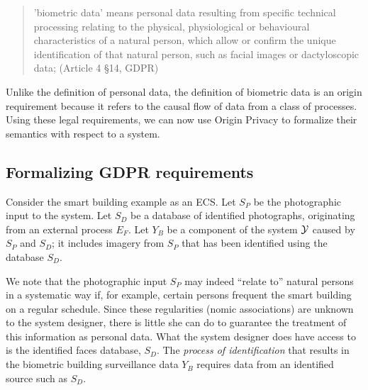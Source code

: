 \documentclass[../thesis.tex]{subfiles}
\begin{document}
\begin{quote}
  'biometric data' means personal data resulting from
  specific technical processing relating to the physical,
  physiological or behavioural characteristics of a
  natural person, which allow or confirm the unique
  identification of that natural person, such as facial
  images or dactyloscopic data; (Article 4 \S 14, GDPR)
\end{quote}

Unlike the definition of personal data, the definition
of biometric data is an origin requirement because it
refers to the causal flow of data from a class of
processes.
Using these legal requirements, we can now
use Origin Privacy to formalize their semantics
with respect to a system.

\subsection{Formalizing GDPR requirements}

Consider the smart building example as an ECS.
Let $S_P$ be the photographic input to the system.
Let $S_D$ be a database of identified photographs,
originating from an external process $E_F$.
Let $Y_B$ be a component of the system $\mathcal{Y}$ caused by
$S_P$ and $S_D$; it includes imagery from $S_P$
that has been identified using the database $S_D$.

\begin{center}
\end{center}

We note that the photographic input $S_P$ may
indeed ``relate to'' natural persons in a systematic
way if, for example, certain persons frequent the
smart building on a regular schedule.
Since these regularities (nomic associations) are
unknown to the system designer, there is little she
can do to guarantee the treatment of this information
as personal data.
What the system designer does have access to is the
identified faces database, $S_D$.
The \emph{process of identification} that results
in the biometric building surveillance data $Y_B$ requires
data from an identified source such as $S_D$.
\end{document}
